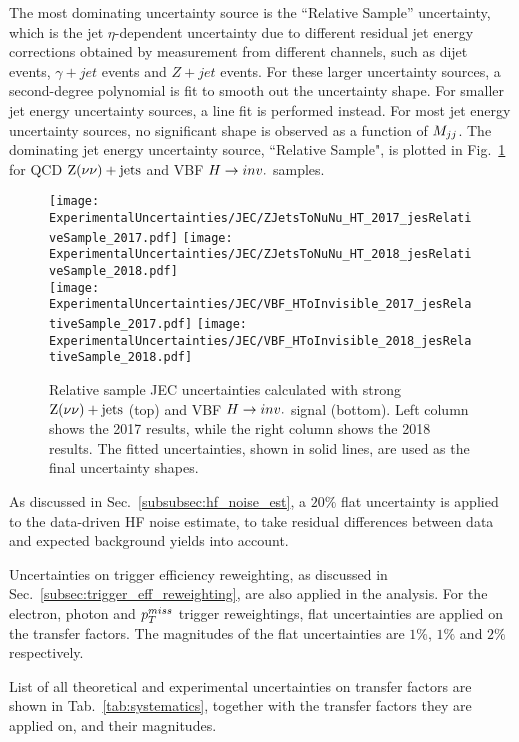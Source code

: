 The most dominating uncertainty source is the ``Relative Sample'' uncertainty, which is the jet $\eta$-dependent uncertainty due to different
residual jet energy corrections obtained by measurement from different channels, such as dijet events, $\gamma+jet$ events and $Z+jet$ events.
For these larger uncertainty sources, a second-degree polynomial is fit to smooth out the uncertainty shape. For smaller jet energy uncertainty sources,
a line fit is performed instead. For most jet energy uncertainty sources, no significant shape is observed as a function of $M_{jj}$.
The dominating jet energy uncertainty source, ``Relative Sample", 
is plotted in Fig.~\ref{fig:znunu_jec_uncs} for QCD $\mathrm{Z}(\nu\nu)+\textrm{jets}$ and VBF $H \rightarrow inv.$ samples.

\begin{figure}[h!]
  \centering
  \texttt{[image: ExperimentalUncertainties/JEC/ZJetsToNuNu\_HT\_2017\_jesRelativeSample\_2017.pdf]}
  \texttt{[image: ExperimentalUncertainties/JEC/ZJetsToNuNu\_HT\_2018\_jesRelativeSample\_2018.pdf]} \\
  \texttt{[image: ExperimentalUncertainties/JEC/VBF\_HToInvisible\_2017\_jesRelativeSample\_2017.pdf]}
  \texttt{[image: ExperimentalUncertainties/JEC/VBF\_HToInvisible\_2018\_jesRelativeSample\_2018.pdf]}
  \caption{Relative sample JEC uncertainties calculated with strong $\mathrm{Z}(\nu\nu)+\textrm{jets}$ (top) and VBF $H \rightarrow inv.$ signal (bottom). Left column shows the 2017 results, 
  while the right column shows the 2018 results. The fitted uncertainties, shown in solid lines, are used as the final uncertainty shapes.}
  \label{fig:znunu_jec_uncs}
\end{figure}

As discussed in Sec.~\ref{subsubsec:hf_noise_est}, a $20\%$ flat uncertainty is applied to the data-driven HF noise estimate, to take residual differences between
data and expected background yields into account.

Uncertainties on trigger efficiency reweighting, as discussed in Sec.~\ref{subsec:trigger_eff_reweighting}, are also applied in the analysis. For the electron, photon and
$p_T^{miss}$ trigger reweightings, flat uncertainties are applied on the transfer factors. The magnitudes of the flat uncertainties are $1\%$, $1\%$ and $2\%$ respectively. 

List of all theoretical and experimental uncertainties on transfer factors are shown in Tab.~\ref{tab:systematics}, together with the transfer factors they are applied on,
and their magnitudes.

